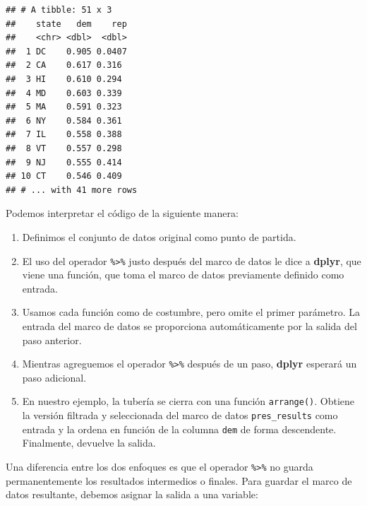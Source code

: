 \documentclass[
]{book}
\newenvironment{Shaded}{\begin{snugshade}}{\end{snugshade}}
\newcommand{\DecValTok}[1]{\textcolor[rgb]{0.00,0.00,0.81}{#1}}
\newcommand{\KeywordTok}[1]{\textcolor[rgb]{0.13,0.29,0.53}{\textbf{#1}}}
\newcommand{\NormalTok}[1]{#1}
\newcommand{\OperatorTok}[1]{\textcolor[rgb]{0.81,0.36,0.00}{\textbf{#1}}}
\newcommand{\StringTok}[1]{\textcolor[rgb]{0.31,0.60,0.02}{#1}}
\providecommand{\tightlist}{%
  \setlength{\itemsep}{0pt}\setlength{\parskip}{0pt}}
\begin{document}
\begin{verbatim}
## # A tibble: 51 x 3
##    state   dem    rep
##    <chr> <dbl>  <dbl>
##  1 DC    0.905 0.0407
##  2 CA    0.617 0.316 
##  3 HI    0.610 0.294 
##  4 MD    0.603 0.339 
##  5 MA    0.591 0.323 
##  6 NY    0.584 0.361 
##  7 IL    0.558 0.388 
##  8 VT    0.557 0.298 
##  9 NJ    0.555 0.414 
## 10 CT    0.546 0.409 
## # ... with 41 more rows
\end{verbatim}

Podemos interpretar el código de la siguiente manera:

\begin{enumerate}
\def\labelenumi{\arabic{enumi}.}
\tightlist
\item
  Definimos el conjunto de datos original como punto de partida.
\item
  El uso del operador \texttt{\%\textgreater{}\%} justo después del marco de datos le dice a \textbf{dplyr}, que viene una función, que toma el marco de datos previamente definido como entrada.
\item
  Usamos cada función como de costumbre, pero omite el primer parámetro. La entrada del marco de datos se proporciona automáticamente por la salida del paso anterior.
\item
  Mientras agreguemos el operador \texttt{\%\textgreater{}\%} después de un paso, \textbf{dplyr} esperará un paso adicional.
\item
  En nuestro ejemplo, la tubería se cierra con una función \texttt{arrange()}. Obtiene la versión filtrada y seleccionada del marco de datos \texttt{pres\_results} como entrada y la ordena en función de la columna \texttt{dem} de forma descendente. Finalmente, devuelve la salida.
\end{enumerate}

Una diferencia entre los dos enfoques es que el operador \texttt{\%\textgreater{}\%} no guarda permanentemente los resultados intermedios o finales. Para guardar el marco de datos resultante, debemos asignar la salida a una variable:

\begin{Shaded}
\end{Shaded}
\end{document}
